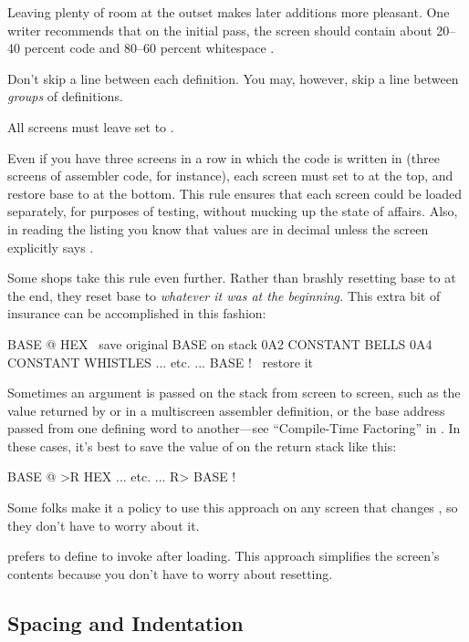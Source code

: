Leaving plenty of room at the outset makes later additions more
pleasant.  One writer recommends that on the initial pass, the screen
should contain about 20--40 percent code and 80--60 percent
whitespace \cite{stevenson81}.

Don't skip a line between each definition.  You may, however, skip a
line between \emph{groups} of definitions.%
\begin{tip}
All screens must leave  set to .
\end{tip}
Even if you have three screens in a row in which the code is written
in  (three screens of assembler code, for instance), each
screen must set  to  at the top, and restore
base to  at the bottom.  This rule ensures that each
screen could be loaded separately, for purposes of testing, without
mucking up the state of affairs.  Also, in reading the listing you
know that values are in decimal unless the screen explicitly
says .

Some shops take this rule even further.  Rather than brashly resetting
base to  at the end, they reset base to \emph{whatever
it was at the beginning.} This extra bit of insurance can be
accomplished in this fashion:
\begin{Code}
BASE @       HEX    \ save original BASE on stack
0A2 CONSTANT BELLS
0A4 CONSTANT WHISTLES
... etc. ...
BASE !              \ restore it
\end{Code}
\noindent Sometimes an argument is passed on the stack from screen to
screen, such as the value returned by  or  in a
multiscreen assembler definition, or the base address passed from one
defining word to another---see ``Compile-Time Factoring'' in .
In these cases, it's best to save the value of  on the
return stack like this:
\begin{Code}
BASE @ >R     HEX
... etc. ...
R> BASE !
\end{Code}
Some folks make it a policy to use this approach on any screen that
changes , so they don't have to worry about it.%

 prefers to define 
to invoke  after loading.  This approach simplifies the
screen's contents because you don't have to worry about resetting.%

\subsection{Spacing and Indentation}%


